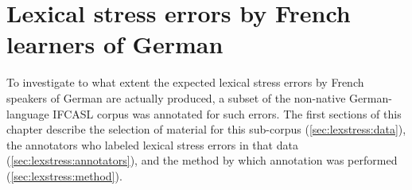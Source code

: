 %
%
\chapter{Lexical stress errors by French learners of German }
\label{chap:lexstress}



%	
	



	To investigate to what extent the expected lexical stress errors by French speakers of German are actually produced, a subset of the non-native German-language IFCASL corpus was annotated for such errors.
	The first sections of this chapter describe the selection of material for this sub-corpus (\cref{sec:lexstress:data}), the annotators who labeled lexical stress errors in that data (\cref{sec:lexstress:annotators}), and the method by which annotation was performed (\cref{sec:lexstress:method}). 
	
